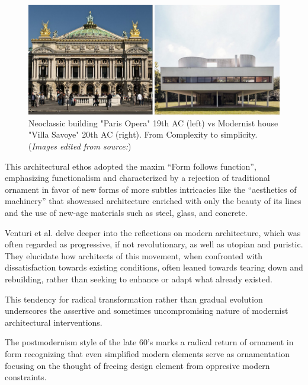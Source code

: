      \begin{figure}[htb]
          \centering
          \includegraphics[width= \linewidth]{Images/NeoclassicismVsModernism}
          \caption{Neoclassic building "Paris Opera" 19th AC (left) vs Modernist house "Villa Savoye" 20th AC (right). From Complexity to simplicity. (\textit{Images edited from source:\cite{Stacbond2020}})}
          \label{fig:NeoclassicalvsModernism}
        \end{figure}

This architectural ethos adopted the maxim ``Form follows function'', emphasizing functionalism and characterized by a rejection of traditional ornament in favor of new forms of more subtles intricacies like the “aesthetics of machinery” that showcased architecture  enriched  with  only  the  beauty of its lines and the use of new-age materials such as steel, glass, and concrete\cite{Gage2015}.

Venturi et al.\cite{Venturi1972} delve deeper into the reflections on modern architecture, which was often regarded as progressive, if not revolutionary, as well as utopian and puristic.
They elucidate how architects of this movement, when confronted with dissatisfaction towards existing conditions, often leaned towards tearing down and rebuilding, rather than seeking to enhance or adapt what already existed.

This tendency for radical transformation rather than gradual evolution underscores the assertive and sometimes uncompromising nature of modernist architectural interventions.


The postmodernism style of the late 60's marks a radical return of ornament in form recognizing that even simplified modern elements serve as ornamentation focusing on the thought of freeing design element from oppresive modern constraints.



